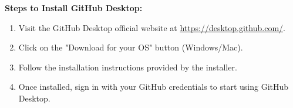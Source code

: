 \documentclass[a4paper,12pt]{article}
\begin{document}
\noindent \textbf{Steps to Install GitHub Desktop:}
\begin{enumerate}
    \item Visit the GitHub Desktop official website at \url{https://desktop.github.com/}.
    \item Click on the "Download for your OS" button (Windows/Mac).
    \item Follow the installation instructions provided by the installer.
    \item Once installed, sign in with your GitHub credentials to start using GitHub Desktop.
\end{enumerate}

\newpage
\end{document}
